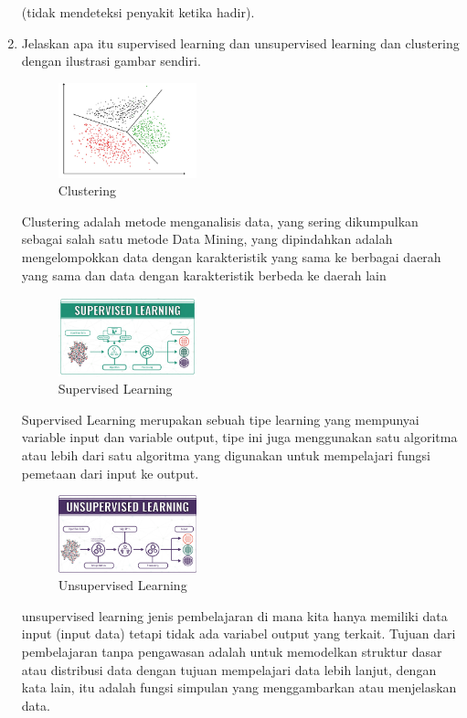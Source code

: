 \begin{enumerate}
	(tidak mendeteksi penyakit ketika hadir).
	\item Jelaskan apa itu supervised learning dan unsupervised learning dan clustering dengan ilustrasi gambar sendiri.
	\hfill\break
	\begin{figure}[H]
		\includegraphics[width=4cm]{figures/1174027/2/clustering.jpg}
		\centering
		\caption{Clustering}
	\end{figure}
	\hfill\break
	Clustering adalah metode menganalisis data, yang sering dikumpulkan sebagai salah satu metode Data Mining, 
	yang dipindahkan adalah mengelompokkan data dengan karakteristik yang sama ke berbagai daerah yang sama dan data dengan karakteristik berbeda ke daerah lain
	\begin{figure}[H]
		\includegraphics[width=4cm]{figures/1174027/2/supervised.png}
		\centering
		\caption{Supervised Learning}
	\end{figure}
	\hfill\break
	Supervised Learning merupakan sebuah tipe learning yang mempunyai variable input dan variable output, 
	tipe ini juga menggunakan satu algoritma atau lebih dari satu algoritma yang digunakan untuk mempelajari fungsi pemetaan dari input ke output.
	\begin{figure}[H]
		\includegraphics[width=4cm]{figures/1174027/2/unsupervised.png}
		\centering
		\caption{Unsupervised Learning}
	\end{figure}
	\hfill\break
	unsupervised learning jenis pembelajaran di mana kita hanya memiliki data input (input data) tetapi tidak ada variabel output yang terkait. 
	Tujuan dari pembelajaran tanpa pengawasan adalah untuk memodelkan struktur dasar atau distribusi data dengan tujuan mempelajari data lebih lanjut, 
	dengan kata lain, itu adalah fungsi simpulan yang menggambarkan atau menjelaskan data.

\end{enumerate}
